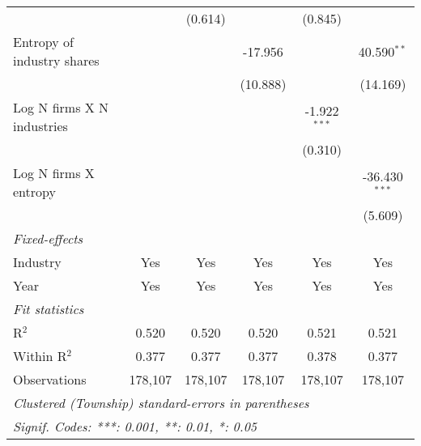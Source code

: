 \begin{tabular}{lccccc}
                                        &                  & (0.614)          &                  & (0.845)          &   \\   
   Entropy of industry shares           &                  &                  & -17.956          &                  & 40.590$^{**}$\\   
                                        &                  &                  & (10.888)         &                  & (14.169)\\   
   Log N firms X N industries           &                  &                  &                  & -1.922$^{***}$   &   \\   
                                        &                  &                  &                  & (0.310)          &   \\   
   Log N firms X entropy                &                  &                  &                  &                  & -36.430$^{***}$\\   
                                        &                  &                  &                  &                  & (5.609)\\   
   \midrule
   \emph{Fixed-effects}\\
   Industry                             & Yes              & Yes              & Yes              & Yes              & Yes\\  
   Year                                 & Yes              & Yes              & Yes              & Yes              & Yes\\  
   \midrule
   \emph{Fit statistics}\\
   R$^2$                                & 0.520            & 0.520            & 0.520            & 0.521            & 0.521\\  
   Within R$^2$                         & 0.377            & 0.377            & 0.377            & 0.378            & 0.377\\  
   Observations                         & 178,107          & 178,107          & 178,107          & 178,107          & 178,107\\  
   \midrule \midrule
   \multicolumn{6}{l}{\emph{Clustered (Township) standard-errors in parentheses}}\\
   \multicolumn{6}{l}{\emph{Signif. Codes: ***: 0.001, **: 0.01, *: 0.05}}\\
\end{tabular}
\par\endgroup
